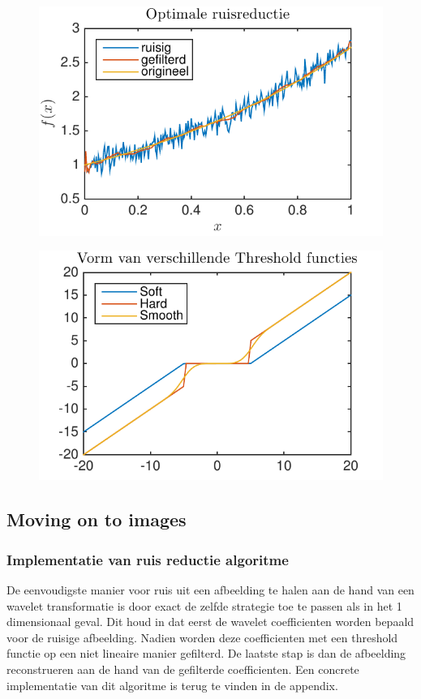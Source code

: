 \begin{figure}
\centering
\includegraphics[width=0.7\linewidth]{../src/denoising/error_1d/Optimale_ruisReductie}
\caption{}
\label{fig:Optimale_ruisReductie}
\end{figure}

\begin{figure}
\centering
\includegraphics[width=0.7\linewidth]{../src/denoising/error_1d/Threshold}
\caption{}
\label{fig:Threshold}
\end{figure}






\subsection{Moving on to images}

\subsubsection{Implementatie van ruis reductie algoritme}


De eenvoudigste manier voor ruis uit een afbeelding te halen aan de hand van een wavelet transformatie is door exact de zelfde strategie toe te passen als in het 1 dimensionaal geval.
Dit houd in dat eerst de wavelet coefficienten worden bepaald voor de ruisige afbeelding.
Nadien worden deze coefficienten met een threshold functie op een niet lineaire manier gefilterd.
De laatste stap is dan de afbeelding reconstrueren aan de hand van de gefilterde coefficienten.
Een concrete implementatie van dit algoritme is terug te vinden in de appendix.

